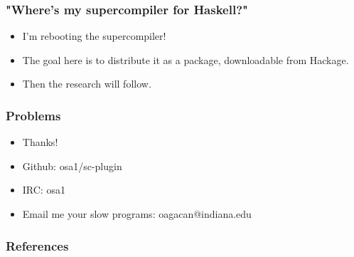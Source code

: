 \documentclass{beamer}
\begin{document}
\begin{frame}
    \frametitle{"Where's my supercompiler for Haskell?"}

    \begin{itemize}[<+->]
        \item
            I'm rebooting the supercompiler!

        \item
            The goal here is to distribute it as a package, downloadable from
            Hackage.

        \item
            Then the research will follow.
    \end{itemize}
\end{frame}

\begin{frame}
    \frametitle{Problems}

\end{frame}

\begin{frame}
    \centering
    \begin{itemize}
        \itemsep1em

        \item[]
            \begin{huge}
                Thanks!
            \end{huge}

        \item[]
            Github: osa1/sc-plugin

        \item[]
            IRC: osa1

        \item[]
            Email me your slow programs: oagacan@indiana.edu

    \end{itemize}
\end{frame}

\begin{frame}[allowframebreaks]
    \frametitle{References}

    
    
\end{frame}
\end{document}
